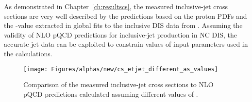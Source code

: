 As demonstrated in Chapter~\ref{ch:resultscs}, the measured inclusive-jet cross sections are very well described by the predictions based on the proton PDFs and the \asz-value extracted in global fits to the inclusive DIS data from \hera. Assuming the validity of NLO pQCD predictions for inclusive-jet production in NC DIS, the accurate jet data can be exploited to constrain values of input parameters used in the calculations.
\begin{figure}[p]
 \centering
 \texttt{[image: Figures/alphas/new/cs\_etjet\_different\_as\_values]}
 \caption{Comparison of the measured inclusive-jet cross sections to NLO pQCD predictions calculated assuming different values of \asz.}
 \label{fig:etjetdifferentas}
\end{figure}

